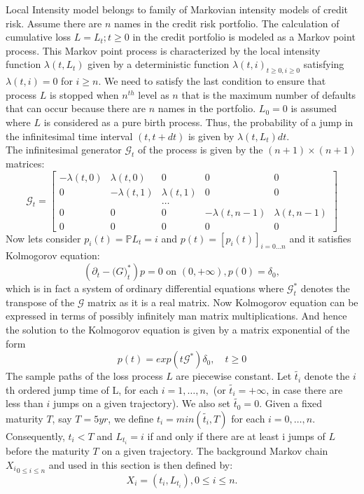 Local Intensity model belongs to family of Markovian intensity models of credit risk.  Assume there are $n$ names in the credit risk portfolio. The calculation of cumulative loss $L = {L_{t};t \geq 0}$ in the credit portfolio is modeled as a Markov point process. This Markov point process is characterized by the local intensity function $\lambda(t,L_{t})$ given by a deterministic function ${\lambda(t,i)}_{t \geq 0,i \geq 0}$ satisfying $\lambda(t,i) = 0$ for $ i \geq n$. We need to satisfy the last condition to ensure that process $L$ is stopped when $n^{th}$ level as $n$ that is the maximum number of defaults that can occur because there are $n$ names in the portfolio. $L_{0} = 0$ is assumed where $L$ is considered as a pure birth process. Thus, the probability of a jump in the infinitesimal time interval $(t,t+dt)$ is given by $\lambda(t,L_{t})dt$. \\
The infinitesimal generator $\mathcal{G}_{t}$ of the process is given by the $(n+1) \times (n+1)$ matrices: \\
\[\mathcal{G}_{t} = 
	\begin{bmatrix}
-\lambda(t,0)& \lambda(t,0) & 0 & 0 & 0 \\
0 & -\lambda(t,1)& \lambda(t,1)  & 0 & 0 \\
 & &\dots & & \\
 0 & 0 & 0 & -\lambda(t,n-1)& \lambda(t,n-1) \\
 0 & 0 & 0 & 0 & 0
\end{bmatrix}
\]
Now lets consider $p_{i}(t) = \mathbb{P}{L_{t}=i}$ and $p(t) = [p_{i}(t)]_{i=0 \dots n}$ and it satisfies Kolmogorov equation:
\begin{equation}
\left(\partial_{t} - \mathcal(G)_{t}^{*}\right)p = 0 \text{ on } (0,+\infty), p(0) = \delta_{0},
\end{equation} 
which is in fact a system of ordinary differential equations where $\mathcal{G}_{t}^{*}$ denotes the transpose of the $\mathcal{G}$ matrix as it is a real matrix. Now Kolmogorov equation can be expressed in terms of possibly infinitely man matrix multiplications. And hence the solution to the Kolmogorov equation is given by a matrix exponential  of the form \\
\begin{equation}
p(t) = exp(t\mathcal{G}^{*})\delta_{0}, \quad t \geq 0
\end{equation}
The sample paths of the loss process $L$ are piecewise constant. Let $\tilde{t_{i}}$ denote the $i$th ordered jump time of L, for each $i = 1, \dots , n,$ (or $\tilde{t_{i}}  = + \infty$, in case there are less than $i$ jumps on a given trajectory). We also set $\tilde{t_{0}} = 0 $. Given a fixed maturity $T$, say $ T = 5yr$, we define $t_{i} = min(\tilde{t_{i}},T)$ for each $i = 0, \dots, n$. Consequently, $t_{i} < T$ and $L_{t_{i}} = i$ if and only if there are at least i jumps of $L$ before the maturity $T$ on a given trajectory. The background Markov chain ${X_{i}}_{0 \leq i \leq n}$ and used in this section is then defined by: \\
\begin{equation}
X_{i} = (t_{i}, L_{t_{i}}), 0 \leq i \leq n.
\end{equation}
